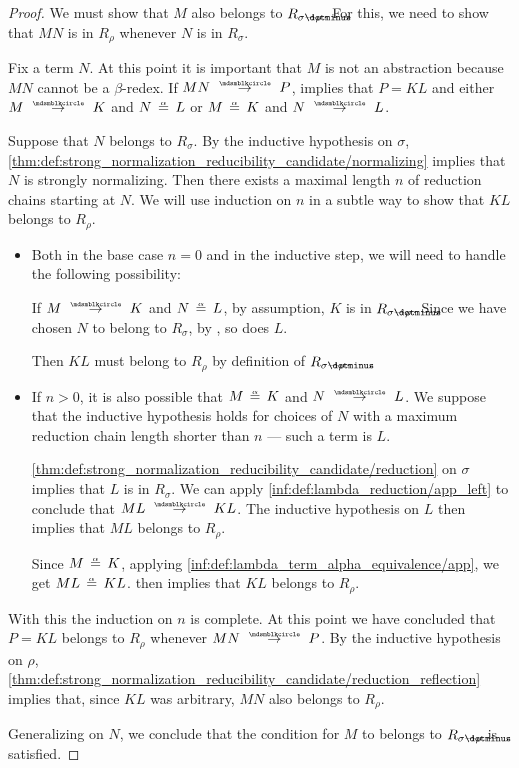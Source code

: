 \begin{proof}
  We must show that \( M \) also belongs to \( R_{\sigma \synimplies \rho} \). For this, we need to show that \( MN \) is in \( R_\rho \) whenever \( N \) is in \( R_\sigma \).

  Fix a term \( N \). At this point it is important that \( M \) is not an abstraction because \( MN \) cannot be a \( \beta \)-redex. If \( MN \pred P \),  implies that \( P = KL \) and either \( M \pred K \) and \( N \aequiv L \) or \( M \aequiv K \) and \( N \pred L \).

  Suppose that \( N \) belongs to \( R_\sigma \). By the inductive hypothesis on \( \sigma \), \ref{thm:def:strong_normalization_reducibility_candidate/normalizing} implies that \( N \) is strongly normalizing. Then there exists a maximal length \( n \) of reduction chains starting at \( N \). We will use induction on \( n \) in a subtle way to show that \( KL \) belongs to \( R_\rho \).

  \begin{itemize}
    \item Both in the base case \( n = 0 \) and in the inductive step, we will need to handle the following possibility:

    If \( M \pred K \) and \( N \aequiv L \), by assumption, \( K \) is in \( R_{\sigma \synimplies \rho} \). Since we have chosen \( N \) to belong to \( R_\sigma \), by , so does \( L \).

    Then \( KL \) must belong to \( R_\rho \) by definition of \( R_{\sigma \synimplies \rho} \).

    \item If \( n > 0 \), it is also possible that \( M \aequiv K \) and \( N \pred L \). We suppose that the inductive hypothesis holds for choices of \( N \) with a maximum reduction chain length shorter than \( n \) --- such a term is \( L \).

    \ref{thm:def:strong_normalization_reducibility_candidate/reduction} on \( \sigma \) implies that \( L \) is in \( R_\sigma \). We can apply \ref{inf:def:lambda_reduction/app_left} to conclude that \( ML \pred KL \). The inductive hypothesis on \( L \) then implies that \( ML \) belongs to \( R_\rho \).

    Since \( M \aequiv K \), applying \ref{inf:def:lambda_term_alpha_equivalence/app}, we get \( ML \aequiv KL \).  then implies that \( KL \) belongs to \( R_\rho \).
  \end{itemize}

  With this the induction on \( n \) is complete. At this point we have concluded that \( P = KL \) belongs to \( R_\rho \) whenever \( MN \pred P \). By the inductive hypothesis on \( \rho \), \ref{thm:def:strong_normalization_reducibility_candidate/reduction_reflection} implies that, since \( KL \) was arbitrary, \( MN \) also belongs to \( R_\rho \).

  Generalizing on \( N \), we conclude that the condition for \( M \) to belongs to \( R_{\sigma \synimplies \rho} \) is satisfied.
\end{proof}

